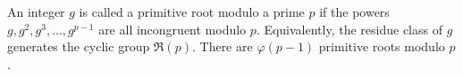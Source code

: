 An integer $g$ is called a primitive root modulo a prime $p$ if the powers $g, g^2, g^3, \ldots, g^{p-1}$ are all incongruent modulo $p$. Equivalently, the residue class of $g$ generates the cyclic group $\mathfrak{R}(p)$. There are $\varphi(p-1)$ primitive roots modulo $p$.
